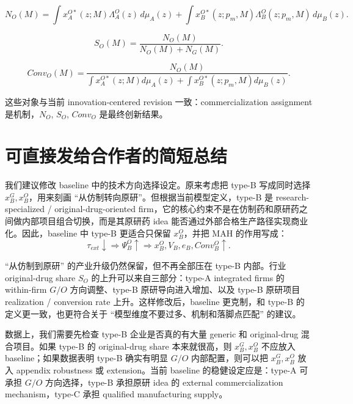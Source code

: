 \documentclass[12pt]{article}
\begin{document}
\[
N_O(M)
=
\int x_A^{O*}(z;M)\Lambda_A^O(z)\,d\mu_A(z)
+
\int x_B^{O*}(z;p_m,M)\Lambda_B^O(z;p_m,M)\,d\mu_B(z).
\]

\[
S_O(M)
=
\frac{N_O(M)}{N_O(M)+N_G(M)}.
\]

\[
Conv_O(M)
=
\frac{N_O(M)}
{\int x_A^{O*}(z;M)d\mu_A(z)+\int x_B^{O*}(z;p_m,M)d\mu_B(z)}.
\]

这些对象与当前 innovation-centered revision 一致：commercialization assignment 是机制，$N_O$, $S_O$, $Conv_O$ 是最终创新结果。

\section{可直接发给合作者的简短总结}

我们建议修改 baseline 中的技术方向选择设定。原来考虑把 type-B 写成同时选择 $x_B^G,x_B^O$，用来刻画 ``从仿制转向原研''。但根据当前模型定义，type-B 是 research-specialized / original-drug-oriented firm，它的核心约束不是在仿制药和原研药之间做内部项目组合切换，而是其原研药 idea 能否通过外部合格生产路径实现商业化。因此，baseline 中 type-B 更适合只保留 $x_B^O$，并把 MAH 的作用写成：
\[
\tau_{ext}\downarrow
\Rightarrow
\Psi_B^O\uparrow
\Rightarrow
x_B^O,V_B,e_B,Conv_B^O\uparrow.
\]

``从仿制到原研'' 的产业升级仍然保留，但不再全部压在 type-B 内部。行业 original-drug share $S_O$ 的上升可以来自三部分：type-A integrated firms 的 within-firm $G/O$ 方向调整、type-B 原研导向进入增加、以及 type-B 原研项目 realization / conversion rate 上升。这样修改后，baseline 更克制，和 type-B 的定义更一致，也更符合关于 ``模型维度不要过多、机制和落脚点匹配'' 的建议。

数据上，我们需要先检查 type-B 企业是否真的有大量 generic 和 original-drug 混合项目。如果 type-B 的 original-drug share 本来就很高，则 $x_B^G,x_B^O$ 不应放入 baseline；如果数据表明 type-B 确实有明显 $G/O$ 内部配置，则可以把 $x_B^G,x_B^O$ 放入 appendix robustness 或 extension。当前 baseline 的稳健设定应是：type-A 可承担 $G/O$ 方向选择，type-B 承担原研 idea 的 external commercialization mechanism，type-C 承担 qualified manufacturing supply。
\end{document}
